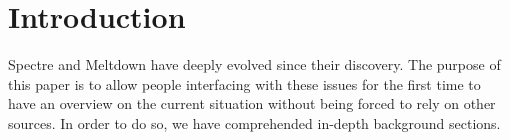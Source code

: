 \section{Introduction}
Spectre and Meltdown have deeply evolved since their discovery.
The purpose of this paper is to allow people interfacing with these issues for the first time to have an overview on the current situation without being forced to rely on other sources.
In order to do so, we have comprehended in-depth background sections.

